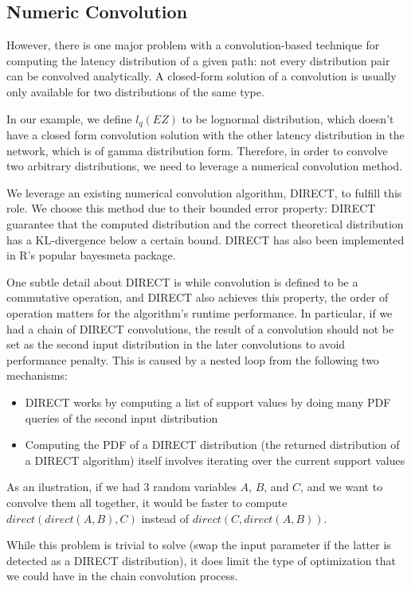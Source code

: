 \documentclass[10pt,sigconf,letterpaper,anonymous,nonacm]{acmart}
\begin{document}
\subsection{Numeric Convolution}
However, there is one major problem with a convolution-based technique for computing the latency distribution 
of a given path: not every distribution pair can be convolved analytically.
A closed-form solution of a convolution is usually only available for two distributions of the same type.

In our example, we define $l_q(EZ)$ to be lognormal distribution, which doesn't have a closed form convolution 
solution with the other latency distribution in the network, which is of gamma distribution form.
Therefore, in order to convolve two arbitrary distributions, we need to leverage a numerical convolution 
method.

We leverage an existing numerical convolution algorithm, DIRECT, to fulfill this role.
We choose this method due to their bounded error property: DIRECT guarantee that the computed 
distribution and the correct theoretical distribution has a KL-divergence below a certain bound.
DIRECT has also been implemented in R's popular bayesmeta package.

One subtle detail about DIRECT is while convolution is defined to be a commutative operation, and 
DIRECT also achieves this property, the order of operation matters for the algorithm's runtime 
performance.
In particular, if we had a chain of DIRECT convolutions, the result of a convolution should not be set 
as the second input distribution in the later convolutions to avoid performance penalty.
This is caused by a nested loop from the following two mechanisms:
\begin{itemize}
    \item DIRECT works by computing a list of support values by doing many PDF queries of the second input
        distribution
    \item Computing the PDF of a DIRECT distribution (the returned distribution of a DIRECT 
        algorithm) itself involves iterating over the current support values
\end{itemize}

As an ilustration, if we had 3 random variables $A$, $B$, and  $C$, and we want 
to convolve them all together, it would be faster to compute $direct(direct(A, B), C)$ instead of 
$direct(C, direct(A, B))$.

While this problem is trivial to solve (swap the input parameter if the latter is detected as a 
DIRECT distribution), it does limit the type of optimization that we could have in the chain convolution 
process.
\end{document}
